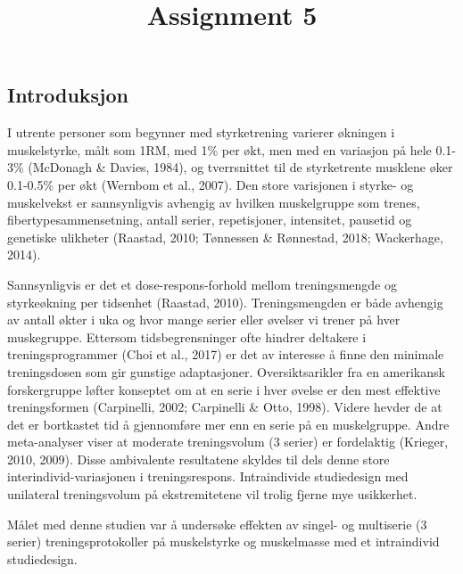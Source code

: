 \documentclass[
  letterpaper,
  DIV=11,
  numbers=noendperiod]{scrartcl}
\title{Assignment 5}
\author{}
\date{}
\begin{document}
\maketitle
\ifdefined\Shaded\renewenvironment{Shaded}{\begin{tcolorbox}[frame hidden, enhanced, borderline west={3pt}{0pt}{shadecolor}, interior hidden, breakable, sharp corners, boxrule=0pt]}{\end{tcolorbox}}\fi

\hypertarget{introduksjon}{%
\subsection{Introduksjon}\label{introduksjon}}

I utrente personer som begynner med styrketrening varierer økningen i
muskelstyrke, målt som 1RM, med 1\% per økt, men med en variasjon på
hele 0.1-3\% (McDonagh \& Davies, 1984), og tverrsnittet til de
styrketrente musklene øker 0.1-0.5\% per økt (Wernbom et al., 2007). Den
store varisjonen i styrke- og muskelvekst er sannsynligvis avhengig av
hvilken muskelgruppe som trenes, fibertypesammensetning, antall serier,
repetisjoner, intensitet, pausetid og genetiske ulikheter (Raastad,
2010; Tønnessen \& Rønnestad, 2018; Wackerhage, 2014).

Sannsynligvis er det et dose-respons-forhold mellom treningsmengde og
styrkeøkning per tidsenhet (Raastad, 2010). Treningsmengden er både
avhengig av antall økter i uka og hvor mange serier eller øvelser vi
trener på hver muskegruppe. Ettersom tidsbegrensninger ofte hindrer
deltakere i treningsprogrammer (Choi et al., 2017) er det av interesse å
finne den minimale treningsdosen som gir gunstige adaptasjoner.
Oversiktsarikler fra en amerikansk forskergruppe løfter konseptet om at
en serie i hver øvelse er den mest effektive treningsformen (Carpinelli,
2002; Carpinelli \& Otto, 1998). Videre hevder de at det er bortkastet
tid å gjennomføre mer enn en serie på en muskelgruppe. Andre
meta-analyser viser at moderate treningsvolum (3 serier) er fordelaktig
(Krieger, 2010, 2009). Disse ambivalente resultatene skyldes til dels
denne store interindivid-variasjonen i treningsrespons. Intraindivide
studiedesign med unilateral treningsvolum på ekstremitetene vil trolig
fjerne mye usikkerhet.

Målet med denne studien var å undersøke effekten av singel- og
multiserie (3 serier) treningsprotokoller på muskelstyrke og muskelmasse
med et intraindivid studiedesign.
\end{document}
